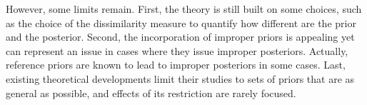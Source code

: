 

However, some limits remain. 
First, the theory is still built on some choices, such as the choice of the dissimilarity measure to quantify how different are the prior and the posterior.
Second, the incorporation of improper priors is appealing yet can represent an issue in cases where they issue improper posteriors. Actually, reference priors are known to lead to improper posteriors in some cases.
Last, existing theoretical developments limit their studies to sets of priors that are as  general as possible, and effects of its restriction are rarely focused.







\newpage
\thispagestyle{plain}




